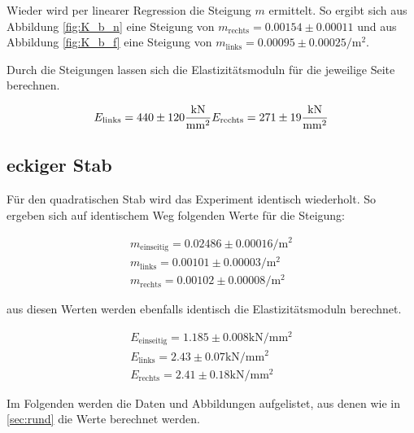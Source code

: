 \noindent Wieder wird per linearer Regression die Steigung $m$ ermittelt. So ergibt sich aus Abbildung \ref{fig:K_b_n} eine Steigung
von $m_\text{rechts}=0.00154 \pm 0.00011$ und aus Abbildung \ref{fig:K_b_f} eine Steigung von 
$m_\text{links}=0.00095\pm0.00025\unit{\per \meter \squared}$.

\noindent Durch die Steigungen lassen sich die Elastizitätsmoduln für die jeweilige Seite berechnen.

\begin{equation}
    E_\text{links} = 440 \pm 120 \unit{\kilo \newton \per \milli \meter \squared} \\
    E_\text{rechts} = 271 \pm 19 \unit{\kilo \newton \per \milli \meter \squared}
\end{equation}


\subsection{eckiger Stab}
Für den quadratischen Stab wird das Experiment identisch wiederholt. 
So ergeben sich auf identischem Weg folgenden Werte für die Steigung:

\begin{align}
    m_\text{einseitig} = 0.02486 \pm 0.00016\unit{\per \meter \squared}  \\
    m_\text{links} = 0.00101\pm0.00003\unit{\per \meter \squared}        \\
    m_\text{rechts} = 0.00102\pm0.00008\unit{\per \meter \squared}
\end{align}

\noindent aus diesen Werten werden ebenfalls identisch die Elastizitätsmoduln berechnet.

\begin{align}
    E_\text{einseitig} =1.185   \pm 0.008\unit{\kilo \newton \per \milli \meter \squared}    \\
    E_\text{links} =    2.43    \pm 0.07\unit{\kilo \newton \per \milli \meter \squared}     \\
    E_\text{rechts} =   2.41    \pm 0.18\unit{\kilo \newton \per \milli \meter \squared}    
\end{align}

\noindent Im Folgenden werden die Daten und Abbildungen aufgelistet, aus denen wie in \autoref{sec:rund} die Werte berechnet werden.

